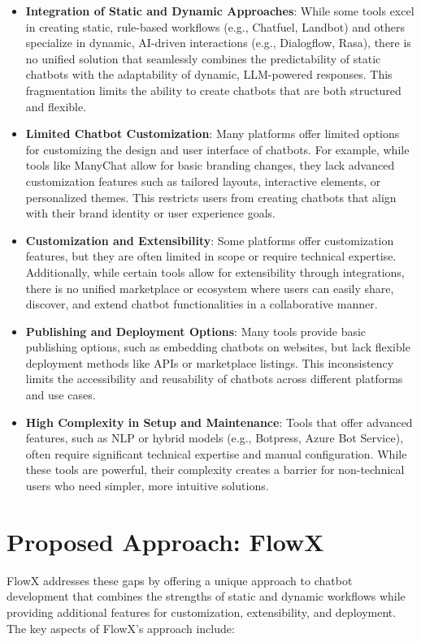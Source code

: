 \begin{itemize}
    \item \textbf{Integration of Static and Dynamic Approaches}: While some tools excel in creating static, rule-based workflows (e.g., Chatfuel, Landbot) and others specialize in dynamic, AI-driven interactions (e.g., Dialogflow, Rasa), there is no unified solution that seamlessly combines the predictability of static chatbots with the adaptability of dynamic, LLM-powered responses. This fragmentation limits the ability to create chatbots that are both structured and flexible.
    
    \item \textbf{Limited Chatbot Customization}: Many platforms offer limited options for customizing the design and user interface of chatbots. For example, while tools like ManyChat allow for basic branding changes, they lack advanced customization features such as tailored layouts, interactive elements, or personalized themes. This restricts users from creating chatbots that align with their brand identity or user experience goals.
    
    \item \textbf{Customization and Extensibility}: Some platforms offer customization features, but they are often limited in scope or require technical expertise. Additionally, while certain tools allow for extensibility through integrations, there is no unified marketplace or ecosystem where users can easily share, discover, and extend chatbot functionalities in a collaborative manner.
    
    \item \textbf{Publishing and Deployment Options}: Many tools provide basic publishing options, such as embedding chatbots on websites, but lack flexible deployment methods like APIs or marketplace listings. This inconsistency limits the accessibility and reusability of chatbots across different platforms and use cases.
    
    \item \textbf{High Complexity in Setup and Maintenance}: Tools that offer advanced features, such as NLP or hybrid models (e.g., Botpress, Azure Bot Service), often require significant technical expertise and manual configuration. While these tools are powerful, their complexity creates a barrier for non-technical users who need simpler, more intuitive solutions.
\end{itemize}

\section{Proposed Approach: FlowX}
FlowX addresses these gaps by offering a unique approach to chatbot development that combines the strengths of static and dynamic workflows while providing additional features for customization, extensibility, and deployment. The key aspects of FlowX's approach include:

